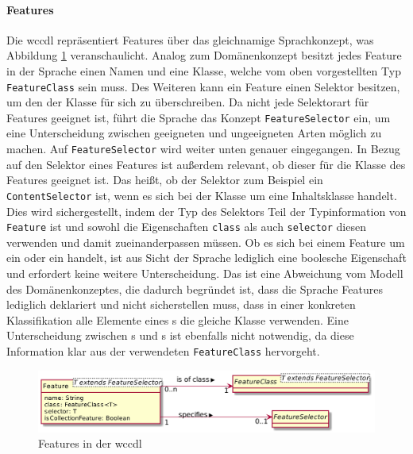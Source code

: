     \paragraph{Features}
    Die \gls{wccdl} repräsentiert Features über das gleichnamige Sprachkonzept,
    was Abbildung \ref{image:dslFeatures} veranschaulicht.
    Analog zum Domänenkonzept besitzt jedes Feature in der Sprache einen Namen
    und eine Klasse, welche vom oben vorgestellten Typ \texttt{FeatureClass} sein muss.
    Des Weiteren kann ein Feature einen Selektor besitzen,
    um den der Klasse für sich zu überschreiben.
    Da nicht jede Selektorart für Features geeignet ist,
    führt die Sprache das Konzept \texttt{FeatureSelector} ein,
    um eine Unterscheidung zwischen geeigneten und ungeeigneten Arten möglich zu machen.
    Auf \texttt{FeatureSelector} wird weiter unten genauer eingegangen.
    In Bezug auf den Selektor eines Features ist außerdem relevant,
    ob dieser für die Klasse des Features geeignet ist.
    Das heißt, ob der Selektor zum Beispiel ein \texttt{ContentSelector} ist,
    wenn es sich bei der Klasse um eine Inhaltsklasse handelt.
    Dies wird sichergestellt,
    indem der Typ des Selektors Teil der Typinformation von
    \texttt{Feature} ist und sowohl die Eigenschaften \texttt{class} als auch
    \texttt{selector} diesen verwenden und damit zueinanderpassen müssen.
    Ob es sich bei einem Feature um ein {\scalarFeature} oder ein {\collectionFeature} handelt,
    ist aus Sicht der Sprache lediglich eine boolesche Eigenschaft und erfordert
    keine weitere Unterscheidung.
    Das ist eine Abweichung vom Modell des Domänenkonzeptes, die dadurch begründet ist,
    dass die Sprache Features lediglich deklariert und nicht sicherstellen muss,
    dass in einer konkreten Klassifikation alle Elemente eines {\collectionFeature}s die gleiche Klasse verwenden.
    Eine Unterscheidung zwischen {\contentFeature}s und {}s
    ist ebenfalls nicht notwendig,
    da diese Information klar aus der verwendeten \texttt{FeatureClass} hervorgeht.

    \begin{figure}[tb]
        \centering
        \includegraphics[scale=\imageScalingFactor]{../resources/dsl/features.png}
        \caption{Features in der \acrshort{wccdl}}
        \label{image:dslFeatures}
    \end{figure}

